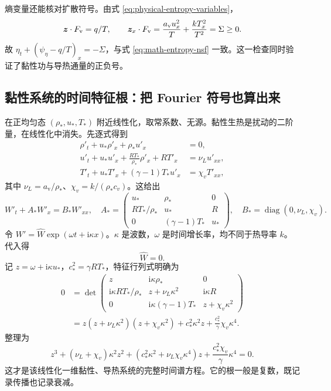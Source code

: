 熵变量还能核对扩散符号。由式 \eqref{eq:physical-entropy-variables}，
\begin{equation}
 \bm{z}\cdot F_{\mathrm v}=q/T,\qquad
 \bm{z}_x\cdot F_{\mathrm v}
 =\frac{a_{\mathrm v}u_x^2}{T}+\frac{kT_x^2}{T^2}=\Sigma\ge0.
\end{equation}
故 $\eta_t+(\psi_\eta-q/T)_x=-\Sigma$，与式 \eqref{eq:math-entropy-nsf} 一致。这一检查同时验证了黏性功与导热通量的正负号。

\subsection{黏性系统的时间特征根：把 Fourier 符号也算出来}

在正均匀态 $(\rho_*,u_*,T_*)$ 附近线性化，取常系数、无源。黏性生热是扰动的二阶量，在线性化中消失。先逐式得到
\begin{align}
 \rho'_t+u_*\rho'_x+\rho_*u'_x&=0,\\
 u'_t+u_*u'_x+\frac{RT_*}{\rho_*}\rho'_x+RT'_x&=\nu_Lu'_{xx},\\
 T'_t+u_*T'_x+(\gamma-1)T_*u'_x&=\chi_vT'_{xx},
\end{align}
其中 $\nu_L=a_{\mathrm v}/\rho_*$、$\chi_v=k/(\rho_*c_v)$。这给出
\begin{equation}
 W'_t+A_*W'_x=B_*W'_{xx},\quad
 A_*=\begin{pmatrix}u_*&\rho_*&0\\RT_*/\rho_*&u_*&R\\0&(\gamma-1)T_*&u_*\end{pmatrix},
 \quad B_*=\operatorname{diag}(0,\nu_L,\chi_v).
\end{equation}
令 $W'=\widehat W\exp(\omega t+\mathrm i\kappa x)$。$\kappa$ 是波数，$\omega$ 是时间增长率，均不同于热导率 $k$。代入得
\begin{equation}
 [\omega I+\mathrm i\kappa A_*+\kappa^2B_*]\widehat W=0.
\end{equation}
记 $z=\omega+\mathrm i\kappa u_*$，$c_*^2=\gamma RT_*$，特征行列式明确为
\begin{align}
 0&=\det\begin{pmatrix}
 z&\mathrm i\kappa\rho_*&0\\
 \mathrm i\kappa RT_*/\rho_*&z+\nu_L\kappa^2&\mathrm i\kappa R\\
 0&\mathrm i\kappa(\gamma-1)T_*&z+\chi_v\kappa^2
 \end{pmatrix}\\
 &=z(z+\nu_L\kappa^2)(z+\chi_v\kappa^2)
 +c_*^2\kappa^2z+\frac{c_*^2}{\gamma}\chi_v\kappa^4.
\end{align}
整理为
\begin{equation}
 \boxed{z^3+(\nu_L+\chi_v)\kappa^2z^2
 +(c_*^2\kappa^2+\nu_L\chi_v\kappa^4)z
 +\frac{c_*^2\chi_v}{\gamma}\kappa^4=0.}
 \label{eq:ns-fourier-polynomial}
\end{equation}
这才是该线性化一维黏性、导热系统的完整时间谱方程。它的根一般是复数，既记录传播也记录衰减。

